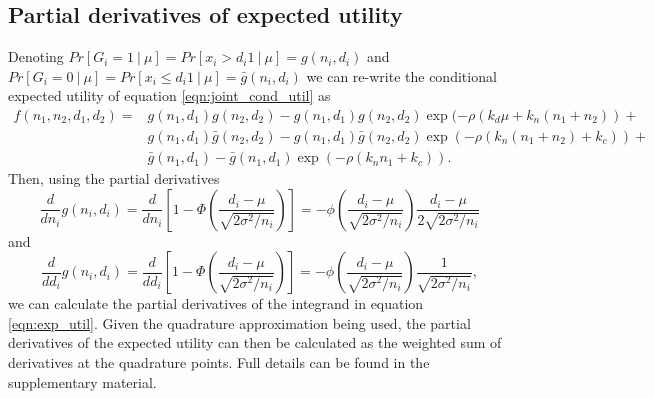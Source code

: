 \documentclass[sagev, Crown]{sagej} %
\begin{document}
\subsection*{Partial derivatives of expected utility}

Denoting $Pr[G_i = 1 ~|~ \mu] = Pr[x_i > d_i 1 ~|~ \mu] = g(n_i, d_i)$ and $Pr[G_i = 0 ~|~ \mu] = Pr[x_i \leq d_i 1 ~|~ \mu] = \bar{g}(n_i, d_i)$ we can re-write the conditional expected utility of equation \ref{eqn:joint_cond_util} as
$$
\begin{aligned}
f(n_1,n_2,d_1,d_2) = &g(n_1,d_1)g(n_2,d_2) - g(n_1,d_1)g(n_2,d_2)\exp(-\rho(k_d\mu + k_n (n_1+n_2)) +\\
&g(n_1,d_1)\bar{g}(n_2,d_2) - g(n_1,d_1)\bar{g}(n_2,d_2)\exp(-\rho(k_n (n_1+n_2) + k_c)) + \\
&\bar{g}(n_1,d_1) - \bar{g}(n_1,d_1)\exp(-\rho(k_n n_1 + k_c)).
\end{aligned}
$$
Then, using the partial derivatives
$$
\frac{d}{dn_i} g(n_i,d_i) = \frac{d}{dn_i} \left[1 - \Phi \left(\frac{d_i-\mu}{\sqrt{2\sigma^2/n_i}} \right)\right] = -\phi\left(\frac{d_i-\mu}{\sqrt{2\sigma^2/n_i}} \right) \frac{d_i-\mu}{2\sqrt{2\sigma^2/n_i}}
$$
and
$$
\frac{d}{dd_i} g(n_i,d_i) = \frac{d}{dd_i} \left[1 - \Phi \left(\frac{d_i-\mu}{\sqrt{2\sigma^2/n_i}} \right)\right] = -\phi\left(\frac{d_i-\mu}{\sqrt{2\sigma^2/n_i}} \right) \frac{1}{\sqrt{2\sigma^2/n_i}},
$$
we can calculate the partial derivatives of the integrand in equation \ref{eqn:exp_util}. Given the quadrature approximation being used, the partial derivatives of the expected utility can then be calculated as the weighted sum of derivatives at the quadrature points. Full details can be found in the supplementary material.
\end{document}
